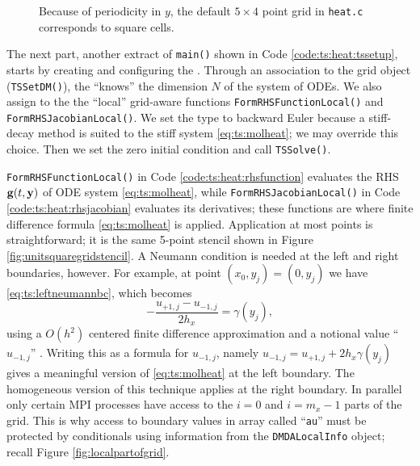 \begin{figure}

\caption{Because of periodicity in $y$, the default $5\times 4$ point grid in \texttt{heat.c} corresponds to square cells.}
\label{fig:ts:heatdefaultgrid}
\end{figure}


The next part, another extract of \texttt{main()} shown in Code \ref{code:ts:heat:tssetup}, starts by creating and configuring the \pTS.  Through an association to the \pDMDA grid object (\texttt{TSSetDM()}), the \pTS ``knows'' the dimension $N$ of the system of ODEs.  We also assign to the \pDMDA the ``local'' grid-aware functions \texttt{FormRHSFunctionLocal()} and \texttt{FormRHSJacobianLocal()}.  We set the \pTS type to backward Euler because a stiff-decay method is suited to the stiff system \eqref{eq:ts:molheat}; we may override this choice.  Then we set the zero initial condition and call \texttt{TSSolve()}.

\texttt{FormRHSFunctionLocal()} in Code \ref{code:ts:heat:rhsfunction} evaluates the RHS $\mathbf{g}(t,\mathbf{y})$ of ODE system \eqref{eq:ts:molheat}, while \texttt{FormRHSJacobianLocal()} in Code \ref{code:ts:heat:rhsjacobian} evaluates its derivatives; these functions are where finite difference formula \eqref{eq:ts:molheat} is applied.  Application at most points is straightforward; it is the same 5-point stencil shown in Figure \ref{fig:unitsquaregridstencil}.  A Neumann condition is needed at the left and right boundaries, however.  For example, at point $(x_0,y_j)=(0,y_j)$ we have \eqref{eq:ts:leftneumannbc}, which becomes
     $$- \frac{u_{+1,j} - u_{-1,j}}{2 h_x} = \gamma(y_j),$$
using a $O(h^2)$ centered finite difference approximation and a notional value ``$u_{-1,j}$'' \citep{MortonMayers2005}.  Writing this as a formula for $u_{-1,j}$, namely $u_{-1,j} = u_{+1,j} + 2 h_x \gamma(y_j)$ gives a meaningful version of \eqref{eq:ts:molheat} at the left boundary.  The homogeneous version of this technique applies at the right boundary.  In parallel only certain MPI processes have access to the $i=0$ and $i=m_x-1$ parts of the grid.  This is why access to boundary values in array called ``\texttt{au}'' must be protected by conditionals using information from the \texttt{DMDALocalInfo} object; recall Figure \ref{fig:localpartofgrid}.


